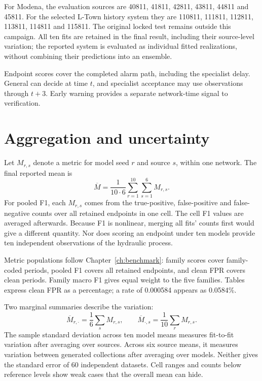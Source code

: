 For Modena, the evaluation sources are 40811, 41811, 42811, 43811, 44811 and 45811. For the selected L-Town history system they are 110811, 111811, 112811, 113811, 114811 and 115811. The original locked test remains outside this campaign. All ten fits are retained in the final result, including their source-level variation; the reported system is evaluated as individual fitted realizations, without combining their predictions into an ensemble.

Endpoint scores cover the completed alarm path, including the specialist delay. General can decide at time $t$, and specialist acceptance may use observations through $t+3$. Early warning provides a separate network-time signal to verification.

\section{Aggregation and uncertainty}
Let $M_{r,s}$ denote a metric for model seed $r$ and source $s$, within one network. The final reported mean is
\begin{equation}
 \overline M=\frac{1}{10\cdot6}\sum_{r=1}^{10}\sum_{s=1}^{6}M_{r,s}.
 \label{eq:cellmean}
\end{equation}
For pooled F1, each $M_{r,s}$ comes from the true-positive, false-positive and false-negative counts over all retained endpoints in one cell. The cell F1 values are averaged afterwards. Because F1 is nonlinear, merging all fits' counts first would give a different quantity. Nor does scoring an endpoint under ten models provide ten independent observations of the hydraulic process.

Metric populations follow Chapter~\ref{ch:benchmark}: family scores cover family-coded periods, pooled F1 covers all retained endpoints, and clean FPR covers clean periods. Family macro F1 gives equal weight to the five families. Tables express clean FPR as a percentage; a rate of 0.000584 appears as 0.0584\%.

Two marginal summaries describe the variation:
\begin{equation}
 \overline M_{r,\cdot}=\frac{1}{6}\sum_s M_{r,s},\qquad
 \overline M_{\cdot,s}=\frac{1}{10}\sum_r M_{r,s}.
 \label{eq:marginalmeans}
\end{equation}
The sample standard deviation across ten model means measures fit-to-fit variation after averaging over sources. Across six source means, it measures variation between generated collections after averaging over models. Neither gives the standard error of 60 independent datasets. Cell ranges and counts below reference levels show weak cases that the overall mean can hide.


